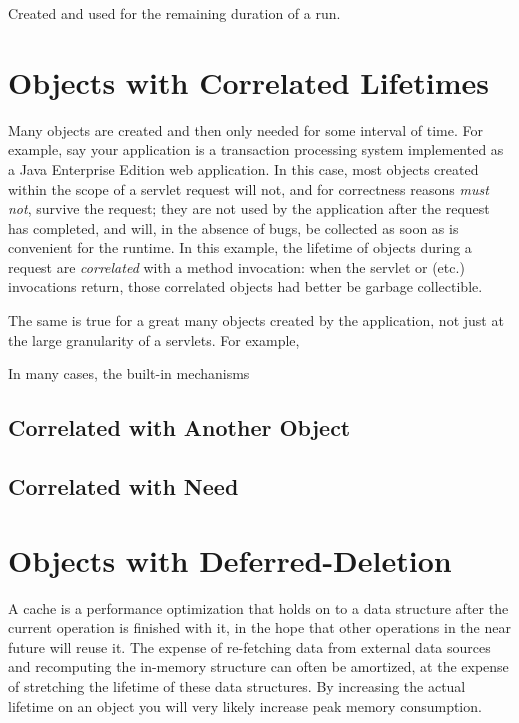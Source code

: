 Created and used for the remaining duration of a run.


\section{Objects with Correlated Lifetimes}

Many objects are created and then only needed for some interval of time. For
example, say your application is a transaction processing system implemented as
a Java Enterprise Edition web application. In this case, most objects
created within the scope of a servlet request will not, and for correctness
reasons {\em must not}, survive the request; they are not used by the 
application after the request has completed, and will, in the absence of bugs,
be collected as soon as is convenient for the runtime. In this example, the
lifetime of objects during a request are {\em correlated} with a method
invocation: when the servlet  or  (etc.) invocations
return, those correlated objects had better be garbage collectible.

The same is true for a great many objects created by the application, not just
at the large granularity of a servlets. For example,

In many cases, the built-in mechanisms 

\subsection{Correlated with Another Object}
\label{correlated-lifetime-1}

\subsection{Correlated with Need}
\label{correlated-lifetime-2}

\section{Objects with Deferred-Deletion}
\label{deferred-deletion}

A cache is a performance optimization that holds on to a data structure after the
current operation is finished with it, in the hope that other operations in the
near future will reuse it. The expense of re-fetching data from external data
sources and recomputing the in-memory structure can often be amortized, at the
expense of stretching the lifetime of these data structures. By increasing the
actual lifetime on an object you will very likely increase peak memory
consumption.




